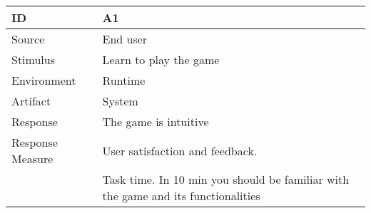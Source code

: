 \begin{center}
	\begin{tabular}{ | l | p{12cm} |}
	\hline
	\textbf{ID} & \textbf{A1} \\ \hline
	Source & End user \\ \hline
	Stimulus & Learn to play the game \\ \hline
	Environment & Runtime \\ \hline
	Artifact & System \\ \hline
	Response & The game is intuitive \\ \hline
	Response Measure &  User satisfaction and feedback. \\
				& Task time. In 10 min you should be familiar with the game and its functionalities \\ \hline
					
	\hline
	\end{tabular}
\end{center}


